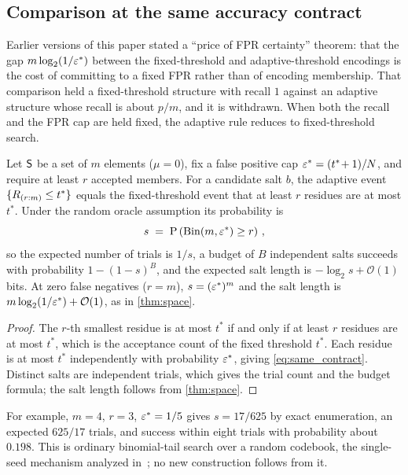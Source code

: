 \subsection{Comparison at the same accuracy contract}
\label{sec:price_certainty}

Earlier versions of this paper stated a ``price of FPR certainty'' theorem:
that the gap $m \log_2(1/\varepsilon^*)$ between the fixed-threshold and
adaptive-threshold encodings is the cost of committing to a fixed FPR rather
than of encoding membership.
That comparison held a fixed-threshold structure with recall $1$ against an
adaptive structure whose recall is about $p/m$, and it is withdrawn.
When both the recall and the FPR cap are held fixed, the adaptive rule
reduces to fixed-threshold search.

\begin{theorem}
\label{thm:price_certainty}
Let $\Set{S}$ be a set of $m$ elements ($\mu = 0$), fix a false positive cap
$\varepsilon^* = (t^*\!+1)/N$, and require at least $r$ accepted members.
For a candidate salt $b$, the adaptive event $\{R_{(r:m)} \leq t^*\}$ equals
the fixed-threshold event that at least $r$ residues are at most $t^*$.
Under the random oracle assumption its probability is
\begin{equation}
\label{eq:same_contract}
    s \;=\; \Prob{\bindist(m, \fprate^*) \geq r}\,,
\end{equation}
so the expected number of trials is $1/s$, a budget of $B$ independent salts
succeeds with probability $1 - (1-s)^B$, and the expected salt length is
$-\log_2 s + \mathcal{O}(1)$ bits.
At zero false negatives ($r = m$), $s = (\varepsilon^*)^m$ and the salt length
is $m \log_2(1/\varepsilon^*) + \mathcal{O}(1)$, as in \cref{thm:space}.
\end{theorem}

\begin{proof}
The $r$-th smallest residue is at most $t^*$ if and only if at least $r$
residues are at most $t^*$, which is the acceptance count of the fixed
threshold $t^*$.
Each residue is at most $t^*$ independently with probability $\varepsilon^*$,
giving \cref{eq:same_contract}.
Distinct salts are independent trials, which gives the trial count and the
budget formula; the salt length follows from \cref{thm:space}.
\end{proof}

For example, $m = 4$, $r = 3$, $\varepsilon^* = 1/5$ gives $s = 17/625$ by exact
enumeration, an expected $625/17$ trials, and success within eight trials
with probability about $0.198$.
This is ordinary binomial-tail search over a random codebook, the
single-seed mechanism analyzed in~\cite[Sec.~1.1]{lehmann2025seeds}; no new
construction follows from it.

